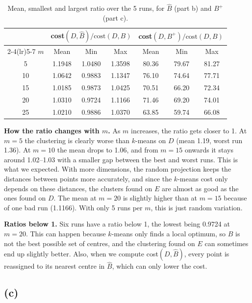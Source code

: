 \documentclass[11pt,a4paper]{article}
\begin{document}
\begin{table}[H]
\centering
\begin{tabular}{c ccc ccc}
\toprule
 & \multicolumn{3}{c}{cost$(D,\hat B)/\text{cost}(D,B)$} & \multicolumn{3}{c}{cost$(D,B^+)/\text{cost}(D,B)$} \\
\cmidrule(lr){2-4}\cmidrule(lr){5-7}
$m$ & Mean & Min & Max & Mean & Min & Max \\
\midrule
5  & 1.1948 & 1.0480 & 1.3598 & 80.36 & 79.67 & 81.27 \\
10 & 1.0642 & 0.9883 & 1.1347 & 76.10 & 74.64 & 77.71 \\
15 & 1.0185 & 0.9873 & 1.0425 & 70.51 & 66.20 & 72.34 \\
20 & 1.0310 & 0.9724 & 1.1166 & 71.46 & 69.20 & 74.01 \\
25 & 1.0210 & 0.9886 & 1.0370 & 63.85 & 59.74 & 66.08 \\
\bottomrule
\end{tabular}
\caption{Mean, smallest and largest ratio over the 5 runs, for $\hat B$ (part b) and $B^+$ (part c).}
\label{tab:summary}
\end{table}

\textbf{How the ratio changes with $m$.} As $m$ increases, the ratio gets closer to 1.
At $m=5$ the clustering is clearly worse than $k$-means on $D$ (mean 1.19, worst run 1.36).
At $m=10$ the mean drops to 1.06, and from $m=15$ onwards it stays around 1.02--1.03 with a
smaller gap between the best and worst runs. This is what we expected. With more dimensions,
the random projection keeps the distances between points more accurately, and since the
$k$-means cost only depends on these distances, the clusters found on $E$ are almost as good
as the ones found on $D$. The mean at $m=20$ is slightly higher than at $m=15$ because of one
bad run (1.1166). With only 5 runs per $m$, this is just random variation.

\textbf{Ratios below 1.} Six runs have a ratio below 1, the lowest being 0.9724 at $m=20$.
This can happen because $k$-means only finds a local optimum, so $B$ is not the best possible
set of centres, and the clustering found on $E$ can sometimes end up slightly better. Also,
when we compute cost$(D,\hat B)$, every point is reassigned to its nearest centre in $\hat B$,
which can only lower the cost.

\subsection*{(c)}
\end{document}

